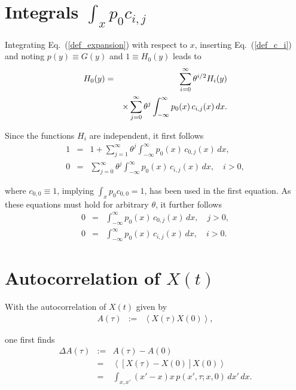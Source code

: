 \documentclass[aps,twocolumn,superscriptaddress,showpacs,showkeys]{revtex4}
\begin{document}
{%
\section{Integrals $\int_xp_0c_{i,j}$}
\label{app_mean_cij}

\noindent Integrating Eq.~(\ref{def_expansion}) with respect to $x$, inserting Eq.~(\ref{def_c_i}) and noting
$p(y)\equiv G(y)$ and $1\equiv H_0(y)$ leads to
%
\begin{eqnarray}
H_0(y) &=& \sum_{i=0}^\infty \theta^{i/2} H_i(y)\cr
&&\times \sum_{j=0}^\infty \theta^j\int_{-\infty}^\infty p_0(x)\, c_{i,j}(x)\,dx.
\end{eqnarray}

\noindent Since the functions $H_i$ are independent, it first follows
%
\begin{eqnarray}
1 &=& 1+\sum_{j=1}^\infty \theta^j\int_{-\infty}^\infty p_0(x)\, c_{0,j}(x)\,dx,\\
0 &=& \sum_{j=0}^\infty \theta^j\int_{-\infty}^\infty p_0(x)\, c_{i,j}(x)\,dx,\quad i>0,
\end{eqnarray}

\noindent where $c_{0,0}\equiv 1$, implying $\int_xp_0c_{0,0}=1$, has been used in the first equation. As these
equations must hold for arbitrary $\theta$, it further follows
%
\begin{eqnarray}
0 &=& \int_{-\infty}^\infty p_0(x)\, c_{0,j}(x)\,dx,\quad j>0,\\
0 &=& \int_{-\infty}^\infty p_0(x)\, c_{i,j}(x)\,dx,\quad i>0.
\end{eqnarray}





\section{Autocorrelation of $X(t)$}
\label{app_autocorr}

\noindent With the autocorrelation of $X(t)$ given by
%
\begin{eqnarray}
A(\tau) &:=& \left<X(\tau)X(0)\right>,
\end{eqnarray}

\noindent one first finds
%
\begin{eqnarray}
\Delta A(\tau) &:=& A(\tau)-A(0)\nonumber\\[.3em]
               &=& \left<[X(\tau)-X(0)]X(0)\right>\nonumber\\[.3em]
               &=& \int_{x,x'}(x'-x)x\, p(x',\tau;x,0)\,dx'\,dx.
\end{eqnarray}

}
\end{document}
